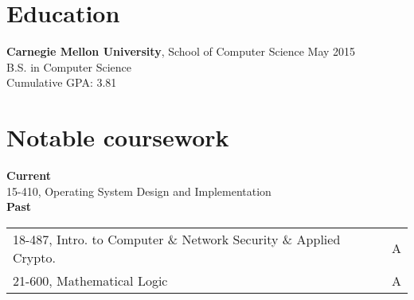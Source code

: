 \documentclass[margin]{res}
\begin{document}

\address{
  5032 Forbes Avenue SMC 6899 \\
  Pittsburgh, PA 15289-6899 \\
  (302) 468-7537
}
\address{  %
  \hfill \href{mailto:joshz@joshz.org}{joshz@joshz.org} \\
  \hfill
    \href{https://github.com/joshzimmerman}{https://github.com/joshzimmerman} \\
  \hfill \href{http://joshz.org}{http://joshz.org}
}

\begin{resume}

\section{Education}
  \textbf{Carnegie Mellon University}, School of Computer Science
    \hfill May 2015\\
  B.S. in Computer Science\\
  Cumulative GPA: 3.81

\section{Notable coursework}
  \textbf{Current}\\
  \hphantom{ } 15-410, Operating System Design and Implementation\\
  \textbf{Past}\vspace{0.25em}\\
  \begin{tabular}{ll}
    18-487, Intro. to Computer \& Network Security \& Applied Crypto. & A\\
                                           21-600, Mathematical Logic & A
  \end{tabular}


\end{resume}
\end{document}
